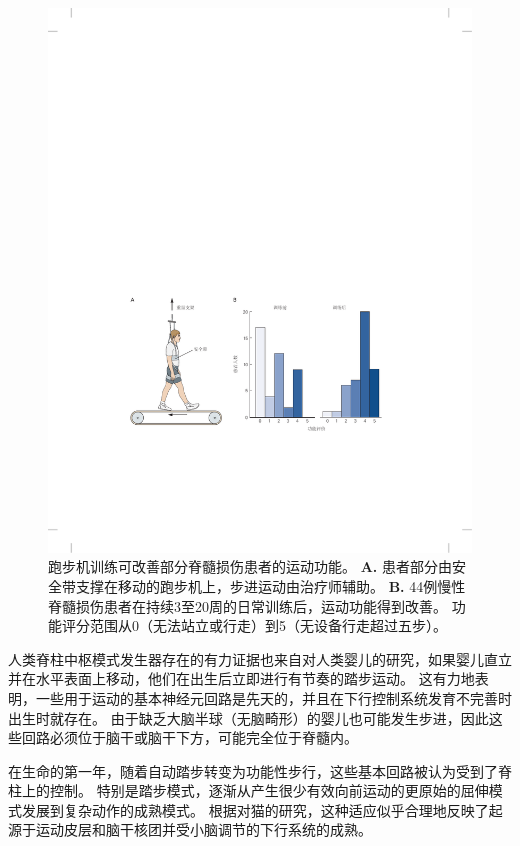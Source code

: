 \begin{figure}[htbp]
	\centering
	\includegraphics[width=1.0\linewidth]{chap33/fig_33_17}
	\caption{跑步机训练可改善部分脊髓损伤患者的运动功能。
		\textbf{A.} 患者部分由安全带支撑在移动的跑步机上，步进运动由治疗师辅助。
		\textbf{B.} 44例慢性脊髓损伤患者在持续3至20周的日常训练后，运动功能得到改善。
		功能评分范围从0（无法站立或行走）到5（无设备行走超过五步）\cite{wernig1995laufband}。}
	\label{fig:33_17}
\end{figure}


人类脊柱中枢模式发生器存在的有力证据也来自对人类婴儿的研究，如果婴儿直立并在水平表面上移动，他们在出生后立即进行有节奏的踏步运动。
这有力地表明，一些用于运动的基本神经元回路是先天的，并且在下行控制系统发育不完善时出生时就存在。
由于缺乏大脑半球（无脑畸形）的婴儿也可能发生步进，因此这些回路必须位于脑干或脑干下方，可能完全位于脊髓内。


在生命的第一年，随着自动踏步转变为功能性步行，这些基本回路被认为受到了脊柱上的控制。
特别是踏步模式，逐渐从产生很少有效向前运动的更原始的屈伸模式发展到复杂动作的成熟模式。
根据对猫的研究，这种适应似乎合理地反映了起源于运动皮层和脑干核团并受小脑调节的下行系统的成熟。


